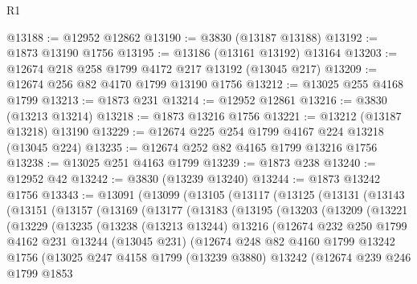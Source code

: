 \begin{lexlean}{R1}
\begin{coremodule}
@13188 := @12952 @12862
@13190 := @3830 (@13187 @13188)
@13192 := @1873 @13190 @1756
@13195 := @13186 (@13161 @13192) @13164
@13203 := @12674 @218 @258 @1799 @4172 @217 @13192 (@13045 @217)
@13209 := @12674 @256 @82 @4170 @1799 @13190 @1756
@13212 := @13025 @255 @4168 @1799
@13213 := @1873 @231
@13214 := @12952 @12861
@13216 := @3830 (@13213 @13214)
@13218 := @1873 @13216 @1756
@13221 := @13212 (@13187 @13218) @13190
@13229 := @12674 @225 @254 @1799 @4167 @224 @13218 (@13045 @224)
@13235 := @12674 @252 @82 @4165 @1799 @13216 @1756
@13238 := @13025 @251 @4163 @1799
@13239 := @1873 @238
@13240 := @12952 @42
@13242 := @3830 (@13239 @13240)
@13244 := @1873 @13242 @1756
@13343 := @13091
    (@13099
      (@13105
        (@13117
          (@13125
            (@13131
              (@13143
                (@13151
                  (@13157
                    (@13169
                      (@13177
                        (@13183
                          (@13195
                            (@13203
                              (@13209
                                (@13221
                                  (@13229
                                    (@13235
                                      (@13238
                                        (@13213 @13244)
                                        @13216
                                        (@12674
                                          @232
                                          @250
                                          @1799
                                          @4162
                                          @231
                                          @13244
                                          (@13045 @231)
                                          (@12674
                                            @248
                                            @82
                                            @4160
                                            @1799
                                            @13242
                                            @1756
                                            (@13025
                                              @247
                                              @4158
                                              @1799
                                              (@13239 @3880)
                                              @13242
                                              (@12674
                                                @239
                                                @246
                                                @1799
                                                @1853

\end{coremodule}
\end{lexlean}
